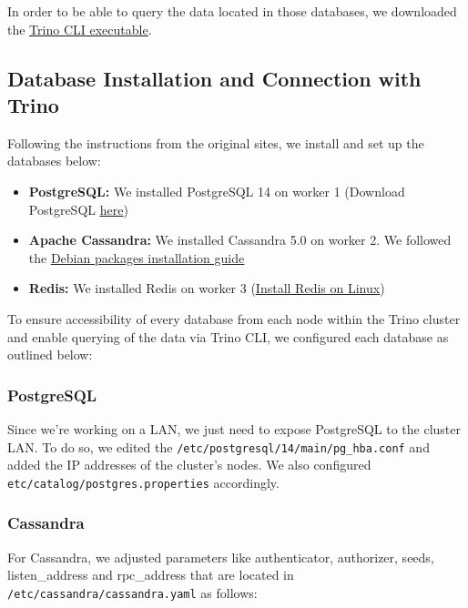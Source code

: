 \documentclass[conference]{IEEEtran}
\begin{document}
In order to be able to query the data located in those databases, we downloaded the \textcolor{linkblue}{\underline{\href{https://trino.io/docs/current/client/cli.html}{Trino CLI executable}}}.

\subsection{Database Installation and Connection with Trino}

Following the instructions from the original sites, we install and set up the databases below:

\begin{itemize}
    \item \textbf{PostgreSQL:} We installed PostgreSQL 14 on worker 1 (Download PostgreSQL \textcolor{linkblue}{\underline{\href{https://www.postgresql.org/download/}{here}}})
    \item \textbf{Apache Cassandra:} We installed Cassandra 5.0 on worker 2. We followed the \textcolor{linkblue}{\underline{\href{https://cassandra.apache.org/doc/stable/cassandra/getting_started/installing.html}{Debian packages installation guide}}}
    \item \textbf{Redis:} We installed Redis on worker 3 (\textcolor{linkblue}{\underline{\href{https://redis.io/docs/install/install-redis/install-redis-on-linux/}{Install Redis on Linux}}})
\end{itemize}


To ensure accessibility of every database from each node within the Trino cluster and enable querying of the data via Trino CLI, we configured each database as outlined below:

\subsubsection{PostgreSQL}

Since we're working on a LAN, we just need to expose PostgreSQL to the cluster LAN. To do so, we edited the \texttt{/etc/postgresql/14/main/pg\_hba.conf} and added
the IP addresses of the cluster's nodes. We also configured \texttt{etc/catalog/postgres.properties} accordingly.

\subsubsection{Cassandra}

For Cassandra, we adjusted parameters like authenticator, authorizer, seeds, listen\_address and rpc\_address that are located in \texttt{/etc/cassandra/cassandra.yaml} as follows:
\end{document}
